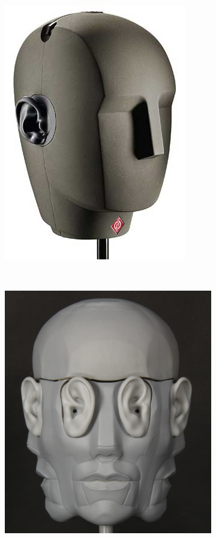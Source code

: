 \documentclass[a4,12pt]{scrartcl}
\begin{document}
\begin{figure}[!h]
	\centering
	\begin{subfigure}{.3\linewidth}
	  \centering
	  \includegraphics[width=0.8\linewidth]{ku-100}
	\end{subfigure}
	~
	\begin{subfigure}{.3\linewidth}
	  \centering
	  \includegraphics[width=\linewidth]{binaural-3d-microphone-head}

\end{subfigure}
\end{figure}
\end{document}
